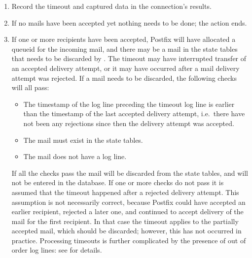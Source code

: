 \begin{enumerate}

    \item Record the timeout and captured data in the connection's results.

    \item If no mails have been accepted yet nothing needs to be done; the
         action ends.

    \item If one or more recipients have been accepted, Postfix will have
        allocated a queueid for the incoming mail, and there may be a mail
        in the state tables that needs to be discarded by \parsername{}.  The timeout may
        have interrupted transfer of an accepted delivery attempt, or it
        may have occurred after a mail delivery attempt was rejected.  If a
        mail needs to be discarded, the following checks will all pass:

        \begin{itemize}

            \item The timestamp of the log line preceding the timeout log
                line is earlier than the timestamp of the last accepted
                delivery attempt, i.e.\ there have not been any rejections
                since then the delivery attempt was accepted.

            \item The mail must exist in the state tables.

            \item The mail does not have a  log line.

        \end{itemize}

        If all the checks pass the mail will be discarded from the state
        tables, and will not be entered in the database.  If one or more
        checks do not pass it is assumed that the timeout happened after a
        rejected delivery attempt.  This assumption is not necessarily
        correct, because Postfix could have accepted an earlier recipient,
        rejected a later one, and continued to accept delivery of the mail
        for the first recipient.  In that case the timeout applies to the
        partially accepted mail, which should be discarded; however, this
        has not occurred in practice.  Processing timeouts is further
        complicated by the presence of out of order  log
        lines: see  for details.

\end{enumerate}

